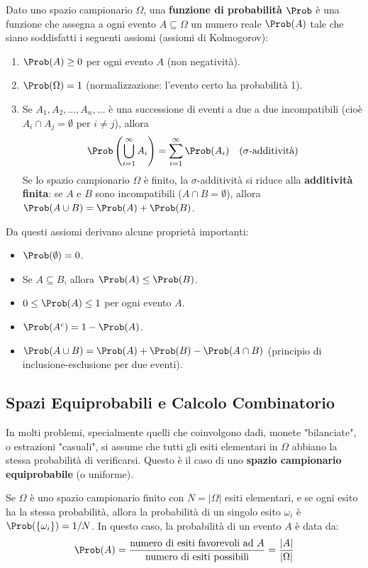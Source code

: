 \begin{definition}[Probabilità]
Dato uno spazio campionario $\Omega$, una \textbf{funzione di probabilità} $\Prob$ è una funzione che assegna a ogni evento $A \subseteq \Omega$ un numero reale $\Prob(A)$ tale che siano soddisfatti i seguenti assiomi (assiomi di Kolmogorov):
\begin{enumerate}
    \item $\Prob(A) \ge 0$ per ogni evento $A$ (non negatività).
    \item $\Prob(\Omega) = 1$ (normalizzazione: l'evento certo ha probabilità 1).
    \item Se $A_1, A_2, \dots, A_n, \dots$ è una successione di eventi a due a due incompatibili (cioè $A_i \cap A_j = \emptyset$ per $i \neq j$), allora
    \[ \Prob\left(\bigcup_{i=1}^{\infty} A_i\right) = \sum_{i=1}^{\infty} \Prob(A_i) \quad (\sigma\text{-additività}) \]
    Se lo spazio campionario $\Omega$ è finito, la $\sigma$-additività si riduce alla \textbf{additività finita}: se $A$ e $B$ sono incompatibili ($A \cap B = \emptyset$), allora $\Prob(A \cup B) = \Prob(A) + \Prob(B)$.
\end{enumerate}
\end{definition}

Da questi assiomi derivano alcune proprietà importanti:
\begin{itemize}
    \item $\Prob(\emptyset) = 0$.
    \item Se $A \subseteq B$, allora $\Prob(A) \le \Prob(B)$.
    \item $0 \le \Prob(A) \le 1$ per ogni evento $A$.
    \item $\Prob(A^c) = 1 - \Prob(A)$.
    \item $\Prob(A \cup B) = \Prob(A) + \Prob(B) - \Prob(A \cap B)$ (principio di inclusione-esclusione per due eventi).
\end{itemize}

\subsection{Spazi Equiprobabili e Calcolo Combinatorio}
In molti problemi, specialmente quelli che coinvolgono dadi, monete "bilanciate", o estrazioni "casuali", si assume che tutti gli esiti elementari in $\Omega$ abbiano la stessa probabilità di verificarsi. Questo è il caso di uno \textbf{spazio campionario equiprobabile} (o uniforme).

Se $\Omega$ è uno spazio campionario finito con $N = |\Omega|$ esiti elementari, e se ogni esito ha la stessa probabilità, allora la probabilità di un singolo esito $\omega_i$ è $\Prob(\{\omega_i\}) = 1/N$.
In questo caso, la probabilità di un evento $A$ è data da:
\[ \Prob(A) = \frac{\text{numero di esiti favorevoli ad } A}{\text{numero di esiti possibili}} = \frac{|A|}{|\Omega|} \]

